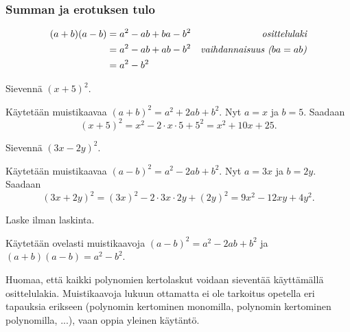 \subsubsection*{Summan ja erotuksen tulo}

\begin{align*}
(a+b)(a-b) &= a^2-ab+ba-b^2 &\emph{osittelulaki} \\
&= a^2-ab+ab-b^2 &\emph{vaihdannaisuus ($ba=ab$)} \\
&= a^2-b^2
\end{align*}

\begin{esimerkki}
Sievennä $(x+5)^2$.
	\begin{esimratk}
Käytetään muistikaavaa $(a+b)^2 = a^2+2ab+b^2$. Nyt $a = x$ ja $b = 5$. Saadaan
        \[ (x+5)^2 = x^2-2\cdot x\cdot 5+5^2 = x^2+10x+25. \]
       \end{esimratk}
\end{esimerkki}

\begin{esimerkki}
Sievennä $(3x-2y)^2$.
	\begin{esimratk}
Käytetään muistikaavaa $(a-b)^2 = a^2-2ab+b^2$. Nyt $a = 3x$ ja $b = 2y$. Saadaan
        \[ (3x+2y)^2 = (3x)^2-2\cdot 3x\cdot 2y+(2y)^2 = 9x^2-12xy+4y^2. \]
        	\end{esimratk}
\end{esimerkki}

\begin{esimerkki}
Laske ilman laskinta.
	\begin{esimratk}
Käytetään ovelasti muistikaavoja $(a-b)^2 = a^2-2ab+b^2$ ja \mbox{$(a+b)(a-b) = a^2-b^2$}.
	\end{esimratk}
\end{esimerkki}

Huomaa, että kaikki polynomien kertolaskut voidaan sieventää käyttämällä osittelulakia. Muistikaavoja lukuun ottamatta ei ole tarkoitus opetella eri tapauksia erikseen (polynomin kertominen monomilla, polynomin kertominen polynomilla, ...), vaan oppia yleinen käytäntö.

